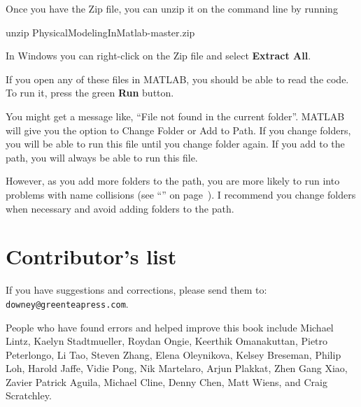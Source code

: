 Once you have the Zip file, you can unzip it on the command line by running

\begin{code}
unzip PhysicalModelingInMatlab-master.zip
\end{code}

In Windows you can right-click on the Zip file and select \textbf{Extract All}.

If you open any of these files in MATLAB, you should be able to read the code.  To run it, press the green \textbf{Run} button.

You might get a message like, ``File not found in the current folder''.
MATLAB will give you the option to Change Folder or Add to Path.  If you change folders, you will be able to run this file until you change folder again.  If you add to the path, you will always be able to run this file.

However, as you add more folders to the path, you are more likely to run into problems with name collisions (see ``'' on page~\pageref{collision}).
I recommend you change folders when necessary and avoid adding folders to the path.


\newpage

\section*{Contributor's list}

If you have suggestions and corrections, please send them to:\\
\verb"downey@greenteapress.com".


People who have found errors and helped improve this book include
Michael Lintz,
Kaelyn Stadtmueller,
Roydan Ongie,
Keerthik Omanakuttan,
Pietro Peterlongo,
Li Tao,
Steven Zhang,
Elena Oleynikova,
Kelsey Breseman,
Philip Loh,
Harold Jaffe,
Vidie Pong,
Nik Martelaro,
Arjun Plakkat,
Zhen Gang Xiao,
Zavier Patrick Aguila,
Michael Cline,
Denny Chen,
Matt Wiens,
and Craig Scratchley.

\newpage
